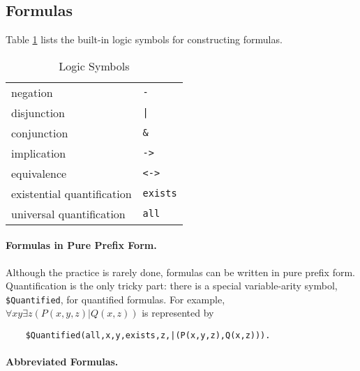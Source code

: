 \documentclass[11pt]{article}
\begin{document}
\subsection{Formulas}

Table \ref{ops-tab} lists the built-in logic symbols for constructing
formulas.
\begin{table}[ht] \centering
\caption{Logic Symbols}   \label{ops-tab}
\begin{tabular}{ll}
\hline
negation    & \verb:-: \\
disjunction  & \verb:|: \\
conjunction & \verb:&: \\
implication & \verb:->: \\
equivalence & \verb:<->: \\
existential quantification & \verb:exists: \\
universal quantification   & \verb:all: \\
\hline
\end{tabular}
\end{table}

\paragraph{Formulas in Pure Prefix Form.}

Although the practice is rarely done, formulas can be written in pure
prefix form.  Quantification is the only tricky part: there is a
special variable-arity symbol, \verb:$Quantified:, for quantified
formulas.  For example, $\forall x y \exists z (P(x,y,z) | Q(x,z))$ is
represented by

{\small
\begin{verbatim}
    $Quantified(all,x,y,exists,z,|(P(x,y,z),Q(x,z))).
\end{verbatim}
}

\paragraph{Abbreviated Formulas.}
\end{document}

